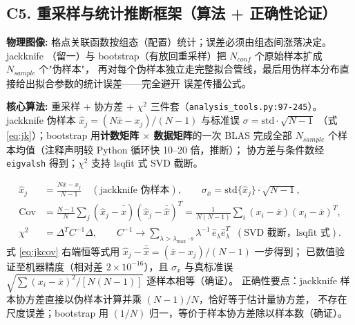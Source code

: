 \documentclass[UTF8]{ctexart}
\begin{document}


\subsection{C5. 重采样与统计推断框架（算法 + 正确性论证）}

\begin{physbox}
\textbf{物理图像:} 格点关联函数按组态（配置）统计；误差必须由组态间涨落决定。jackknife
（留一）与 bootstrap（有放回重采样）把 $N_{conf}$ 个原始样本扩成 $N_{sample}$ 个"伪样本"，
再对每个伪样本独立走完整拟合管线，最后用伪样本分布直接给出拟合参数的统计误差——完全避开
误差传播公式。
\end{physbox}

\begin{algobox}
\textbf{核心算法:} 重采样 + 协方差 + $\chi^2$ 三件套（\texttt{\nolinkurl{analysis_tools.py:97-245}}）。
jackknife 伪样本 $\hat x_j=(N\bar x-x_j)/(N-1)$ 与标准误 $\sigma=\text{std}\cdot\sqrt{N-1}$
（式 \eqref{eq:jk}）；bootstrap 用\textbf{计数矩阵 $\times$ 数据矩阵}的一次 BLAS 完成全部
$N_{sample}$ 个样本均值（注释声明较 Python 循环快 10--20 倍，\textcolor{phys}{推断}）；
协方差与条件数经 \texttt{eigvalsh} 得到；$\chi^2$ 支持 lsqfit 式 SVD 截断。
\end{algobox}

\begin{align}
\hat x_j &= \frac{N\bar x-x_j}{N-1} \label{eq:jk}
\quad(\text{jackknife 伪样本}),\qquad
\sigma_{\bar x}=\text{std}\{\hat x_j\}\cdot\sqrt{N-1}, \\
\mathrm{Cov} &= \frac{N-1}{N}\sum_j(\hat x_j-\bar{\hat x})(\hat x_j-\bar{\hat x})^T
=\frac{1}{N(N-1)}\sum_i(x_i-\bar x)(x_i-\bar x)^T,\label{eq:jkcov}\\
\chi^2 &= \Delta^T C^{-1}\Delta,\qquad
C^{-1}\to\sum_{\lambda>\lambda_{\max}\cdot s} \lambda^{-1}\,\hat e_\lambda\hat e_\lambda^T
\;\;(\text{SVD 截断，lsqfit 式}).\label{eq:chi2}
\end{align}
式 \eqref{eq:jkcov} 右端恒等式用 $\hat x_j-\bar{\hat x}=(\bar x-x_j)/(N-1)$ 一步得到；
已数值验证至机器精度（相对差 $2\times10^{-16}$），且 $\sigma_{\bar x}$ 与真标准误
$\sqrt{\sum(x_i-\bar x)^2/[N(N-1)]}$ 逐样本相等（\textcolor{accent}{确证}）。
正确性要点：jackknife 样本协方差直接以伪样本计算并乘 $(N-1)/N$，恰好等于估计量协方差，
不存在尺度误差；bootstrap 用 $(1/N)$ 归一，等价于样本协方差除以样本数（\textcolor{accent}{确证}）。
\end{document}
